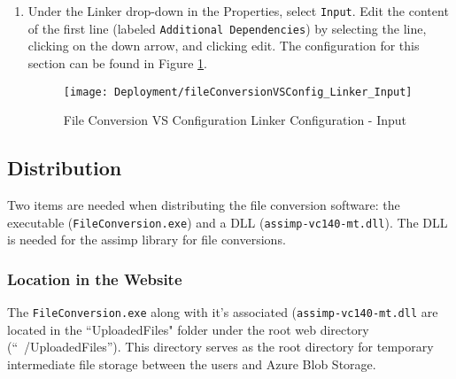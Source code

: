 \begin{enumerate}
            \item Under the Linker drop-down in the Properties, select \texttt{Input}.  Edit the content of the first line (labeled \texttt{Additional Dependencies}) by selecting the line, clicking on the down arrow, and clicking edit.  The configuration for this section can be found in Figure \ref{fig:fileconversionVSConfig2}.

            \begin{figure}[H]
                \texttt{[image: Deployment/fileConversionVSConfig\_Linker\_Input]}
                \centering
                \caption{File Conversion VS Configuration Linker Configuration - Input}
                \label{fig:fileconversionVSConfig2}
            \end{figure}
    \end{enumerate}

    \subsection{Distribution}

        Two items are needed when distributing the file conversion software: the executable (\texttt{FileConversion.exe}) and a DLL (\texttt{assimp-vc140-mt.dll}).  The DLL is needed for the assimp library for file conversions.

        \subsubsection{Location in the Website}
        The \texttt{FileConversion.exe} along with it's associated (\texttt{assimp-vc140-mt.dll} are located in the ``UploadedFiles" folder under the root web directory (``~/UploadedFiles'').  This directory serves as the root directory for temporary intermediate file storage between the users and Azure Blob Storage.